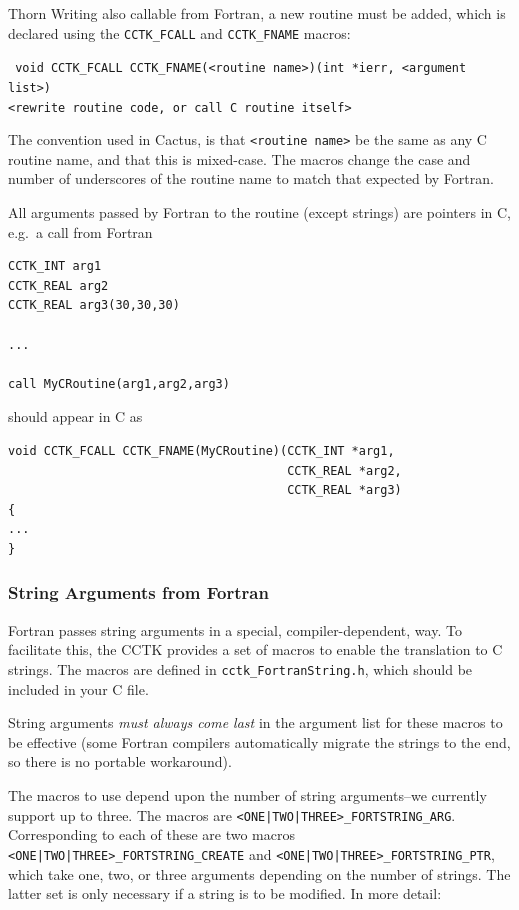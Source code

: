 \begin{cactuspart}{Thorn Writing}
also callable from Fortran, a new routine must be added, which is
declared using the \texttt{CCTK\_FCALL} and \texttt{CCTK\_FNAME} macros:

{\tt
void CCTK\_FCALL CCTK\_FNAME(<routine name>)(int *ierr, <argument list>)\\
<rewrite routine code, or call C routine itself>
}

The convention used in Cactus, is that \texttt{<routine name>} be the same as any
C routine name, and that this is mixed-case.  The macros change
the case and number of underscores of the routine name to match that expected
by Fortran.

All arguments passed by Fortran to the routine (except strings) are
pointers in C, e.g.\ a call from Fortran

\begin{verbatim}
CCTK_INT arg1
CCTK_REAL arg2
CCTK_REAL arg3(30,30,30)

...

call MyCRoutine(arg1,arg2,arg3)
\end{verbatim}

should appear in C as

\begin{verbatim}
void CCTK_FCALL CCTK_FNAME(MyCRoutine)(CCTK_INT *arg1,
                                       CCTK_REAL *arg2,
                                       CCTK_REAL *arg3)
{
...
}
\end{verbatim}

\subsubsection{String Arguments from Fortran}

Fortran passes string arguments in a special, compiler-dependent, way.
To facilitate this, the CCTK provides a set of macros to enable the
translation to C strings.
The macros are defined in \texttt{cctk\_FortranString.h}, which
should be included in your C file.

String arguments \emph{must always come last} in the argument list for
these macros to be effective (some Fortran compilers automatically
migrate the strings to the end, so there is no portable workaround).

The macros to use depend upon the number of string arguments--we
currently support up to three.  The macros are
\texttt{<ONE|TWO|THREE>\_FORTSTRING\_ARG}.
Corresponding to each of these are two macros
\texttt{<ONE|TWO|THREE>\_FORTSTRING\_CREATE} and
\texttt{<ONE|TWO|THREE>\_FORTSTRING\_PTR},
which take one, two, or three arguments depending on the number of strings.
The latter set is only necessary if a string is to be modified.
In more detail:


\end{cactuspart}

